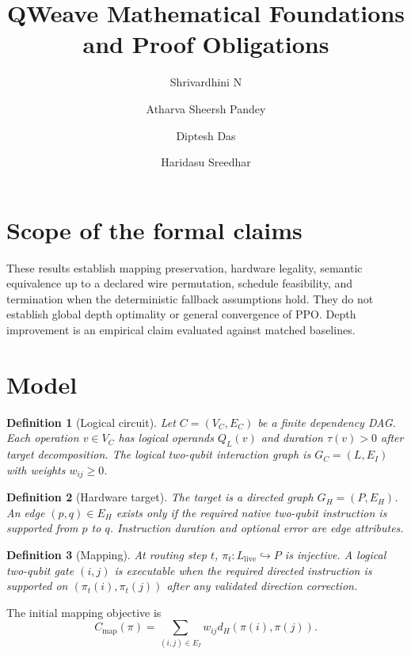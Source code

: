 \documentclass[11pt]{article}
\title{QWeave Mathematical Foundations and Proof Obligations}
\author{Shrivardhini N \and Atharva Sheersh Pandey \and Diptesh Das \and Haridasu Sreedhar}
\date{}
\newtheorem{definition}{Definition}
\begin{document}
\maketitle

\section{Scope of the formal claims}
These results establish mapping preservation, hardware legality, semantic equivalence up to a declared wire permutation, schedule feasibility, and termination when the deterministic fallback assumptions hold. They do not establish global depth optimality or general convergence of PPO. Depth improvement is an empirical claim evaluated against matched baselines.

\section{Model}
\begin{definition}[Logical circuit]
Let $C=(V_C,E_C)$ be a finite dependency DAG. Each operation $v\in V_C$ has logical operands $Q_L(v)$ and duration $\tau(v)>0$ after target decomposition. The logical two-qubit interaction graph is $G_C=(L,E_I)$ with weights $w_{ij}\ge 0$.
\end{definition}

\begin{definition}[Hardware target]
The target is a directed graph $G_H=(P,E_H)$. An edge $(p,q)\in E_H$ exists only if the required native two-qubit instruction is supported from $p$ to $q$. Instruction duration and optional error are edge attributes.
\end{definition}

\begin{definition}[Mapping]
At routing step $t$, $\pi_t:L_{\mathrm{live}}\hookrightarrow P$ is injective. A logical two-qubit gate $(i,j)$ is executable when the required directed instruction is supported on $(\pi_t(i),\pi_t(j))$ after any validated direction correction.
\end{definition}

The initial mapping objective is
\begin{equation}
C_{\mathrm{map}}(\pi)=\sum_{(i,j)\in E_I}w_{ij}d_H\!\left(\pi(i),\pi(j)\right).
\end{equation}
\end{document}
